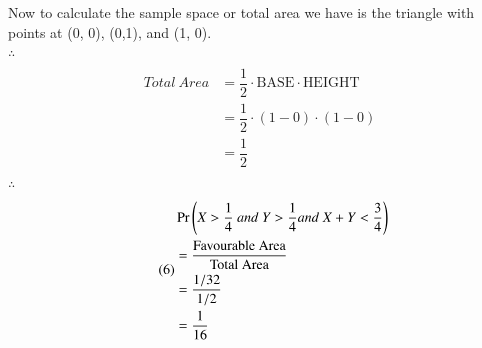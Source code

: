 \documentclass[journal,12pt,twocolumn]{IEEEtran}
\begin{document}
Now to calculate the sample space or total area we have is the triangle with points at (0, 0), (0,1), and (1, 0).\\
$\therefore$
\begin{align}\tag{5}
    \begin{split}
        Total\ Area &= \dfrac{1}{2}\cdot\text{BASE}\cdot\text{HEIGHT}\\
                        &= \dfrac{1}{2}\cdot(1-0)\cdot(1-0)\\
                        &= \dfrac{1}{2}
    \end{split}
\end{align}
$\therefore$
\begin{align}\tag{6}
    \begin{split}
        &\Pr\left(X > \dfrac{1}{4}\ and\ Y > \dfrac{1}{4} and\ X + Y < \dfrac{3}{4}\right)\\
    &= \dfrac{\text{Favourable\ Area}}{\text{Total\  Area}}\\
    &= \dfrac{1/32}{1/2}\\
    &= \dfrac{1}{16}
\end{split}
\end{align}
\end{document}
